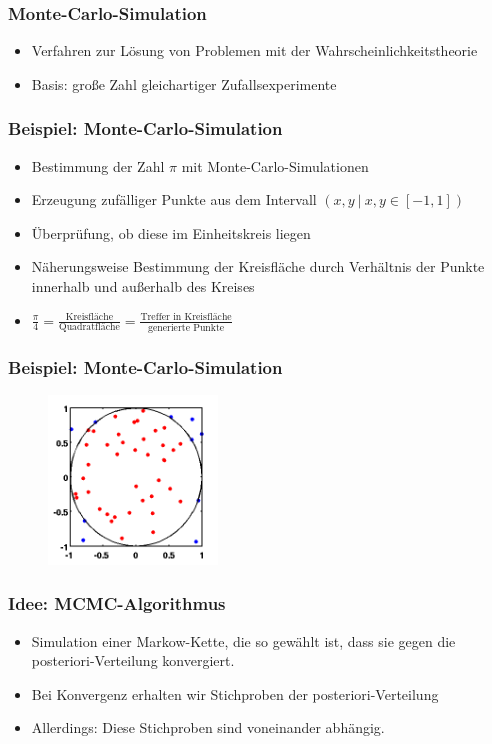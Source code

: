 \documentclass[aspectratio=169,xcolor=dvipsnames]{beamer}
\begin{document}
\begin{frame}
\frametitle{Monte-Carlo-Simulation}
\begin{itemize}
	\item<1-> Verfahren zur Lösung von Problemen mit der Wahrscheinlichkeitstheorie
	\item<2-> Basis: große Zahl gleichartiger Zufallsexperimente
\end{itemize}
\end{frame}

\begin{frame}
\frametitle{Beispiel: Monte-Carlo-Simulation}
\begin{itemize}
	\item<1-> Bestimmung der Zahl $\pi$ mit Monte-Carlo-Simulationen
	\item<2-> Erzeugung zufälliger Punkte aus dem Intervall $(x,y ~\vert~ x,y \in \left[ -1,1 \right] )$
	\item<3-> Überprüfung, ob diese im Einheitskreis liegen
	\item<4-> Näherungsweise Bestimmung der Kreisfläche durch Verhältnis der Punkte innerhalb und außerhalb des Kreises
	\item<5-> $\frac{\pi}{4} =\frac{\text{Kreisfläche}}{\text{Quadratfläche}} =\frac{\text{Treffer in Kreisfläche}}{\text{generierte Punkte}}$
\end{itemize}
\end{frame}

\begin{frame}
\frametitle{Beispiel: Monte-Carlo-Simulation}
\begin{figure}
\includegraphics[width=0.4\textwidth]{MonteCarlo}
\end{figure}
\end{frame}

\begin{frame}
\frametitle{Idee: MCMC-Algorithmus}
\begin{itemize}
	\item<1-> Simulation einer Markow-Kette, die so gewählt ist, dass sie gegen die posteriori-Verteilung konvergiert.
	\item<2-> Bei Konvergenz erhalten wir Stichproben der posteriori-Verteilung
	\item<3-> Allerdings: Diese Stichproben sind voneinander abhängig.
\end{itemize}
\end{frame}
\end{document}
